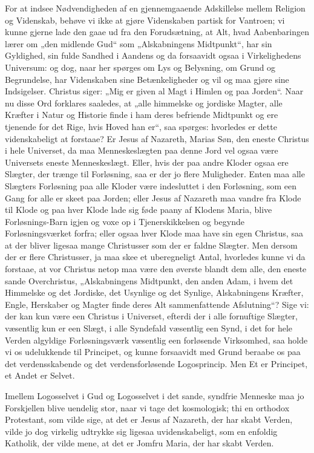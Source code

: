 \documentclass[12pt]{book}
\begin{document}
For at indsee Nødvendigheden af en gjennemgaaende Adskillelse mellem
Religion og Videnskab, behøve vi ikke at gjøre Videnskaben partisk
for Vantroen; vi kunne gjerne lade den gaae ud fra den
Forudsætning, at Alt, hvad Aabenbaringen lærer om „den midlende Gud“
som „Alskabningens Midtpunkt“, har sin Gyldighed, sin fulde Sandhed
i Aandens og da forsaavidt ogsaa i Virkelighedens Universum: og dog,
naar her spørges om Lys og Belysning, om Grund og Begrundelse, har
Videnskaben sine Betænkeligheder og vil og maa gjøre sine
Indsigelser. Christus siger: „Mig er given al Magt i Himlen og paa
Jorden“. Naar nu disse Ord forklares saaledes, at „alle himmelske og
jordiske Magter, alle Kræfter i Natur og Historie finde i ham deres
befriende Midtpunkt og ere tjenende for det Rige, hvis Hoved han
er“, saa spørges: hvorledes er dette videnskabeligt at forstaae? Er
Jesus af Nazareth, Marias Søn, den eneste Christus i hele Universet,
da maa Menneskeslægten paa denne Jord vel ogsaa være Universets
eneste Menneskeslægt. Eller, hvis der paa andre Kloder ogsaa ere
Slægter, der trænge til Forløsning, saa er der jo flere Muligheder.
Enten maa alle Slægters Forløsning paa alle Kloder være indesluttet
i den Forløsning, som een Gang for alle er skeet paa Jorden; eller
Jesus af Nazareth maa vandre fra Klode til Klode og paa hver Klode
lade sig føde paany af Klodens Maria, blive Forløsnings-Barn igjen
og voxe op i Tjenerskikkelsen og begynde Forløsningsværket forfra;
eller ogsaa hver Klode maa have sin egen Christus, saa at der bliver
ligesaa mange Christusser som der er faldne Slægter. Men dersom der
er flere Christusser, ja maa\-
skee et uberegneligt Antal, hvorledes kunne vi da forstaae, at vor
Christus netop maa være den øverste blandt dem alle, den eneste
sande Overchristus, „Alskabningens Midtpunkt, den anden Adam, i
hvem det Himmelske og det Jordiske, det Usynlige og det Synlige,
Alskabningens Kræfter, Engle, Herskaber og Magter finde deres Alt
sammenfattende Afslutning“? Sige vi: der kan kun være een Christus i
Universet, efterdi der i alle fornuftige Slægter, væsentlig kun er
een Slægt, i alle Syndefald væsentlig een Synd, i det for hele
Verden algyldige Forløsningsværk væsentlig een forløsende
Virksomhed, saa holde vi os udelukkende til Principet, og kunne
forsaavidt med Grund beraabe os paa det verdensskabende og det
verdensforløsende Logosprincip. Men Et er Principet, et Andet er
Selvet.

Imellem Logosselvet i Gud og Logosselvet i det sande, syndfrie
Menneske maa jo Forskjellen blive uendelig stor, naar vi tage det
kosmologisk; thi en orthodox Protestant, som vilde sige, at det er
Jesus af Nazareth, der har skabt Verden, vilde jo dog virkelig
udtrykke sig ligesaa uvidenskabeligt, som en enfoldig Katholik, der
vilde mene, at det er Jomfru Maria, der har skabt Verden.
\end{document}
